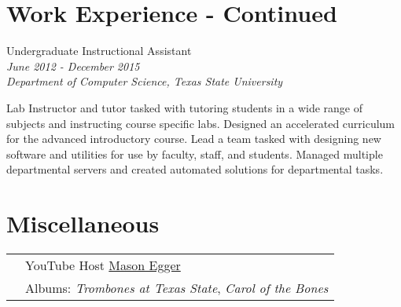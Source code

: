 \documentclass[10pt]{article} %
\begin{document}
\begin{minipage}[t]{0.5\textwidth} %
\vspace{0pt} %
\section{Work Experience - Continued} 


{\raggedright\large Undergraduate Instructional Assistant\\
\textit{June 2012 - December 2015} \\
\textit{Department of Computer Science, Texas State University}\\[5pt]}

\normalsize{Lab Instructor and tutor tasked with tutoring students in a wide range of subjects and instructing course specific labs. Designed an accelerated curriculum for the advanced introductory course. Lead a team tasked with designing new software and utilities for use by faculty, staff, and students. Managed multiple departmental servers and created automated solutions for departmental tasks.}\\

\end{minipage}
\hfill
\begin{minipage}[t]{0.44\textwidth} %
\vspace{0pt} %


\section{Miscellaneous} 

\begin{tabular}{rl}
& YouTube Host \href{https://www.youtube.com/masonegger}{Mason Egger}\\
& Albums: \textit{Trombones at Texas State}, \textit{Carol of the Bones} \\
\end{tabular}\\

\end{minipage}
\end{document}
